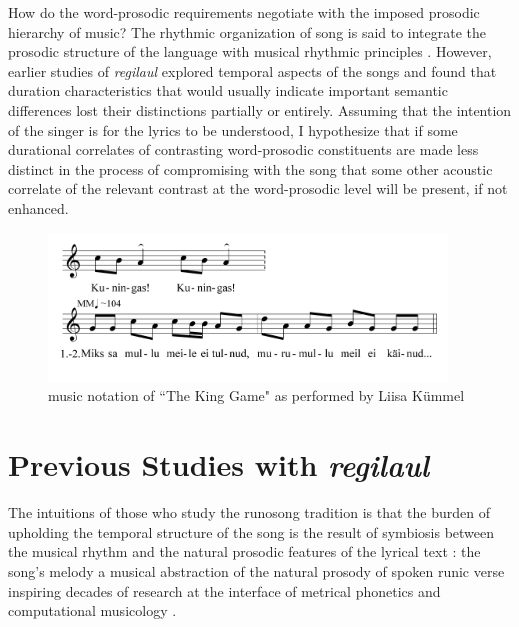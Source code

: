 How do the word-prosodic requirements negotiate with the imposed prosodic hierarchy of music? The rhythmic organization of song is said to integrate the prosodic structure of the language with musical rhythmic principles \citep{palmer1992}. However, earlier studies of {\it regilaul} explored temporal aspects of the songs and found that duration characteristics that would usually indicate important semantic differences lost their distinctions partially or entirely. Assuming that the intention of the singer is for the lyrics to be understood, I hypothesize that if some durational correlates of contrasting word-prosodic constituents are made less distinct in the process of compromising with the song that some other acoustic correlate of the relevant contrast at the word-prosodic level will be present, if not enhanced.  

\begin{figure}[htbp]
\begin{center}
\includegraphics[width=300pt]{figures/094.png}
\caption{music notation of ``The King Game" as performed by Liisa Kümmel}
\label{The King Game}
\end{center}
\end{figure}


\section{Previous Studies with {\it regilaul}}

The intuitions of those who study the runosong tradition is that the burden of upholding the temporal structure of the song is the result of symbiosis between the musical rhythm and the natural prosodic features of the lyrical text \citep{ross1992, tampere1934}: the song's melody a musical abstraction of the natural prosody of spoken runic verse 
inspiring decades of research at the interface of metrical phonetics and computational musicology \cite{ruutel1999}.
%
% 



